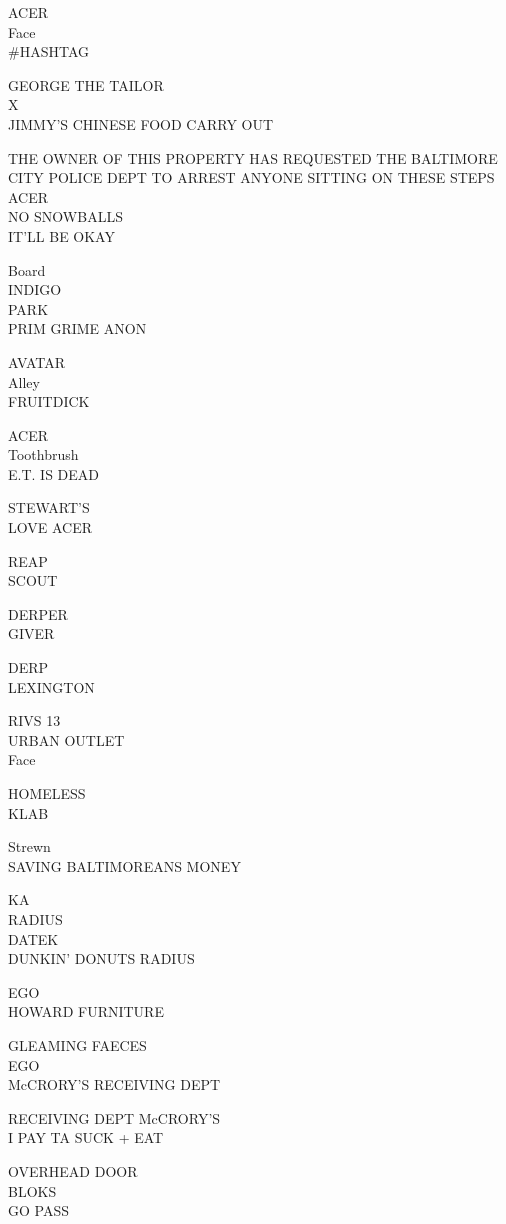 \documentclass[10pt,letterpaper]{article}
\begin{document}
ACER\\
Face\\
\#HASHTAG

GEORGE THE TAILOR\\
X\\
JIMMY'S CHINESE FOOD CARRY OUT

THE OWNER OF THIS PROPERTY HAS REQUESTED THE BALTIMORE CITY POLICE DEPT TO ARREST ANYONE SITTING ON THESE STEPS\\
ACER\\
NO SNOWBALLS\\
IT'LL BE OKAY

Board\\
INDIGO\\
PARK\\
PRIM GRIME ANON

AVATAR\\
Alley\\
FRUITDICK

ACER\\
Toothbrush\\
E.T. IS DEAD

STEWART'S\\
LOVE ACER

REAP\\
SCOUT

DERPER\\
GIVER

DERP\\
LEXINGTON

RIVS 13\\
URBAN OUTLET\\
Face

HOMELESS\\
KLAB

Strewn\\
SAVING BALTIMOREANS MONEY

KA\\
RADIUS\\
DATEK\\
DUNKIN' DONUTS RADIUS

EGO\\
HOWARD FURNITURE

GLEAMING FAECES\\
EGO\\
McCRORY'S RECEIVING DEPT

RECEIVING DEPT McCRORY'S\\
I PAY TA SUCK + EAT

OVERHEAD DOOR\\
BLOKS\\
GO PASS
\end{document}
